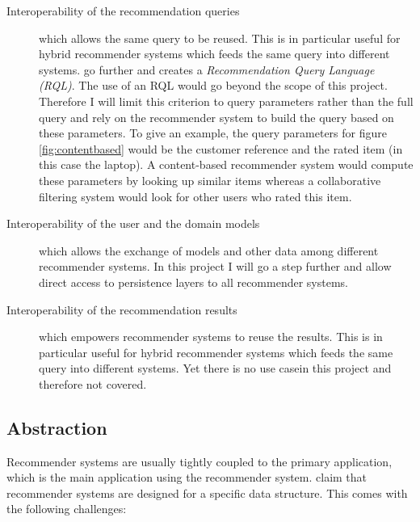 \begin{description}
    \item[Interoperability of the recommendation queries] which allows the same query to be reused. This is in particular useful for hybrid recommender systems which feeds the same query into different systems. \citet{adomavicius05} go further and creates a \emph{Recommendation Query Language (RQL)}. The use of an RQL would go beyond the scope of this project. Therefore I will limit this criterion to query parameters rather than the full query and rely on the recommender system to build the query based on these parameters. To give an example, the query parameters for figure \ref{fig:contentbased} would be the customer reference and the rated item (in this case the laptop). A content-based recommender system would compute these parameters by looking up similar items whereas a collaborative filtering system would look for other users who rated this item.
    \item[Interoperability of the user and the domain models] which allows the exchange of models and other data among different recommender systems. In this project I will go a step further and allow direct access to persistence layers to all recommender systems.
    \item[Interoperability of the recommendation results] which empowers recommender systems to reuse the results. This is in particular useful for hybrid recommender systems which feeds the same query into different systems. Yet there is no use casein this project and therefore not covered.
\end{description}

\subsection{Abstraction}
\label{problem-abstraction}

Recommender systems are usually tightly coupled to the primary application, which is the main application using the recommender system. \citet{cortizo10} claim that recommender systems are designed for a specific data structure. This comes with the following challenges:

